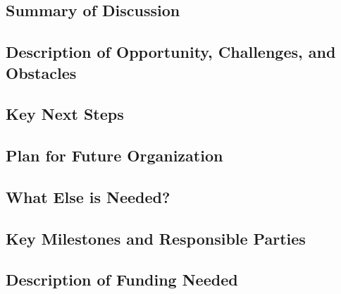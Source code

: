 \subsection{Summary of Discussion}

\subsection{Description of Opportunity, Challenges, and Obstacles}


\subsection{Key Next Steps}


\subsection{Plan for Future Organization}


\subsection{What Else is Needed?}


\subsection{Key Milestones and Responsible Parties}


\subsection{Description of Funding Needed}
